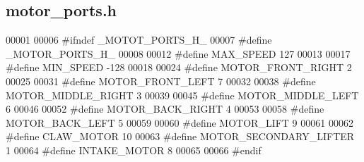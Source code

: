 \subsection{motor\+\_\+ports.\+h}
\label{motor__ports_8h_source}

\begin{DoxyCode}
00001 
00006 \textcolor{preprocessor}{#ifndef \_MOTOT\_PORTS\_H\_}
00007 \textcolor{preprocessor}{#define \_MOTOR\_PORTS\_H\_}
00008 
00012 \textcolor{preprocessor}{#define MAX\_SPEED 127}
00013 
00017 \textcolor{preprocessor}{#define MIN\_SPEED -128}
00018 
00024 \textcolor{preprocessor}{#define MOTOR\_FRONT\_RIGHT 2}
00025 
00031 \textcolor{preprocessor}{#define MOTOR\_FRONT\_LEFT 7}
00032 
00038 \textcolor{preprocessor}{#define MOTOR\_MIDDLE\_RIGHT 3}
00039 
00045 \textcolor{preprocessor}{#define MOTOR\_MIDDLE\_LEFT 6}
00046 
00052 \textcolor{preprocessor}{#define MOTOR\_BACK\_RIGHT 4}
00053 
00058 \textcolor{preprocessor}{#define MOTOR\_BACK\_LEFT 5}
00059 
00060 \textcolor{preprocessor}{#define MOTOR\_LIFT 9}
00061 
00062 \textcolor{preprocessor}{#define CLAW\_MOTOR 10}
00063 \textcolor{preprocessor}{#define MOTOR\_SECONDARY\_LIFTER 1}
00064 \textcolor{preprocessor}{#define INTAKE\_MOTOR 8}
00065 
00066 \textcolor{preprocessor}{#endif}
\end{DoxyCode}
